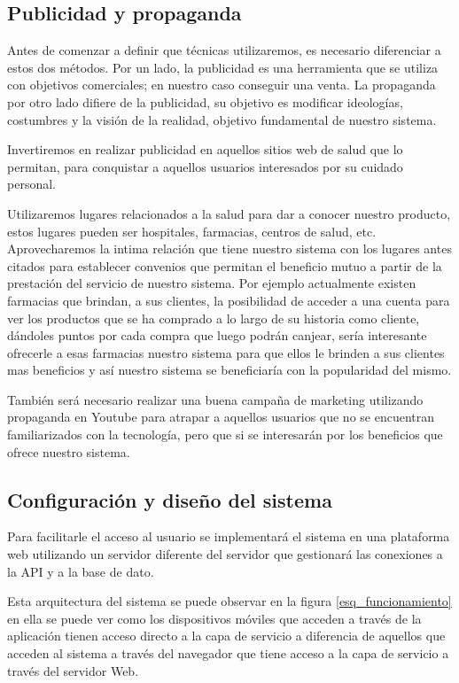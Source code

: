 \documentclass[a4paper,12pt]{article}
\begin{document}
\subsection{Publicidad y propaganda}

Antes de comenzar a definir que técnicas utilizaremos, es necesario diferenciar a estos dos métodos. Por un lado, la publicidad es una herramienta que se utiliza con objetivos comerciales; en nuestro caso conseguir una venta. La propaganda por otro lado difiere de la publicidad, su objetivo es modificar ideologías, costumbres y la visión de la realidad, objetivo fundamental de nuestro sistema.

Invertiremos en realizar publicidad en aquellos sitios web de salud que lo permitan, para conquistar a aquellos usuarios interesados por su cuidado personal.

Utilizaremos lugares relacionados a la salud para dar a conocer nuestro producto, estos lugares pueden ser hospitales, farmacias, centros de salud, etc. Aprovecharemos la intima relación que tiene nuestro sistema con los lugares antes citados para establecer  convenios que permitan el beneficio mutuo  a partir de la prestación del servicio de nuestro sistema. 
Por ejemplo actualmente existen farmacias que brindan, a sus clientes, la posibilidad  de acceder a una cuenta para ver  los productos que se ha comprado a lo largo de su historia como cliente, dándoles puntos por cada compra que luego podrán canjear, sería interesante ofrecerle a esas farmacias nuestro sistema para que ellos le brinden a sus clientes mas beneficios y así nuestro sistema se beneficiaría con la popularidad del mismo.

También será necesario realizar una buena campaña de marketing utilizando propaganda en Youtube para atrapar a aquellos usuarios que no se encuentran familiarizados con la tecnología, pero que si se interesarán por los beneficios que ofrece nuestro sistema.

\subsection{Configuración y diseño del sistema}
Para facilitarle el acceso al usuario se implementará el sistema en una plataforma web utilizando un servidor diferente del servidor que gestionará las conexiones a la  API y a la base de dato.

Esta arquitectura del sistema se puede observar en la figura \ref{esq_funcionamiento} en ella se puede ver como los dispositivos móviles que acceden a través de la aplicación tienen acceso directo a la capa de servicio a diferencia de aquellos que acceden al sistema a través del navegador que tiene acceso a la capa de servicio a través del servidor Web.
\end{document}
